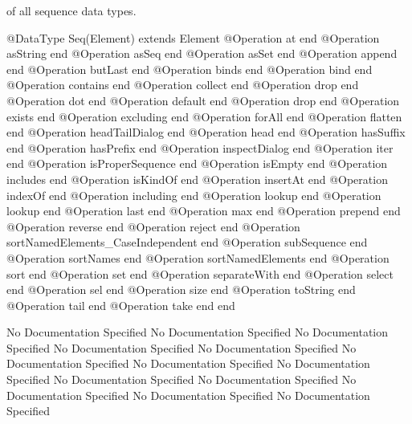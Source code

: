       of all sequence data types.
\begin{Interface}
@DataType Seq(Element) extends Element
  @Operation at end
  @Operation asString end
  @Operation asSeq end
  @Operation asSet end
  @Operation append end
  @Operation butLast end
  @Operation binds end
  @Operation bind end
  @Operation contains end
  @Operation collect end
  @Operation drop end
  @Operation dot end
  @Operation default end
  @Operation drop end
  @Operation exists end
  @Operation excluding end
  @Operation forAll end
  @Operation flatten end
  @Operation headTailDialog end
  @Operation head end
  @Operation hasSuffix end
  @Operation hasPrefix end
  @Operation inspectDialog end
  @Operation iter end
  @Operation isProperSequence end
  @Operation isEmpty end
  @Operation includes end
  @Operation isKindOf end
  @Operation insertAt end
  @Operation indexOf end
  @Operation including end
  @Operation lookup end
  @Operation lookup end
  @Operation last end
  @Operation max end
  @Operation prepend end
  @Operation reverse end
  @Operation reject end
  @Operation sortNamedElements_CaseIndependent end
  @Operation subSequence end
  @Operation sortNames end
  @Operation sortNamedElements end
  @Operation sort end
  @Operation set end
  @Operation separateWith end
  @Operation select end
  @Operation sel end
  @Operation size end
  @Operation toString end
  @Operation tail end
  @Operation take end
end
\end{Interface}
No Documentation Specified
No Documentation Specified
No Documentation Specified
No Documentation Specified
No Documentation Specified
No Documentation Specified
No Documentation Specified
No Documentation Specified
No Documentation Specified
No Documentation Specified
No Documentation Specified
No Documentation Specified
No Documentation Specified
